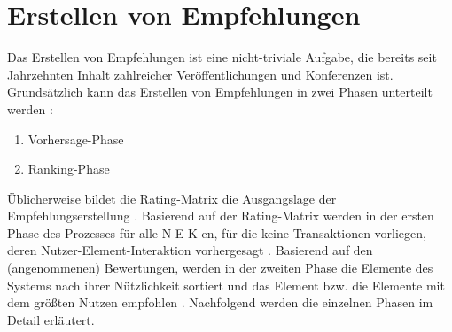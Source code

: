 \section{Erstellen von Empfehlungen}
\label{ch:empfehlungssysteme:empfehlungserstellung}
Das Erstellen von Empfehlungen ist eine nicht-triviale Aufgabe, die bereits seit Jahrzehnten Inhalt zahlreicher Veröffentlichungen und Konferenzen ist.
Grundsätzlich kann das Erstellen von Empfehlungen in zwei Phasen unterteilt werden \cite[S. 405]{unternährer:article}\cite[S. 854]{adomavicius:4:inbook}\cite[S. 898]{adomavicius:article}:
\begin{enumerate}
	\item Vorhersage-Phase
	\item Ranking-Phase
\end{enumerate}

Üblicherweise bildet die Rating-Matrix die Ausgangslage der Empfehlungserstellung \cite[S. 48]{adomavicius:inproceedings:2}.
Basierend auf der Rating-Matrix werden in der ersten Phase des Prozesses für alle \ac{N-E-K}-en, für die keine Transaktionen vorliegen, deren Nutzer-Element-Interaktion vorhergesagt \cite[S. 3]{recommenderSystems:2016}.
Basierend auf den (angenommenen) Bewertungen, werden in der zweiten Phase die Elemente des Systems nach ihrer Nützlichkeit sortiert und das Element bzw. die Elemente mit dem größten Nutzen empfohlen \cite[S. 898]{adomavicius:article}.
Nachfolgend werden die einzelnen Phasen im Detail erläutert.

